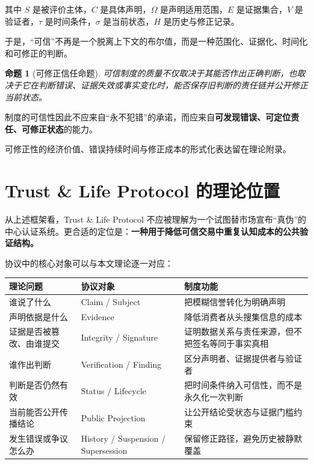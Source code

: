 \documentclass[UTF8,12pt]{ctexart}
\newtheorem{proposition}{命题}
\begin{document}
其中 $S$ 是被评价主体，$C$ 是具体声明，$\Omega$ 是声明适用范围，$E$ 是证据集合，$V$ 是验证者，$\tau$ 是时间条件，$\sigma$ 是当前状态，$H$ 是历史与修正记录。

于是，“可信”不再是一个脱离上下文的布尔值，而是一种范围化、证据化、时间化和可修正的判断。

\begin{proposition}[可修正信任命题]
可信制度的质量不仅取决于其能否作出正确判断，也取决于它在判断错误、证据失效或事实变化时，能否保存旧判断的责任链并公开修正当前状态。
\end{proposition}

制度的可信性因此不应来自“永不犯错”的承诺，而应来自\textbf{可发现错误、可定位责任、可修正状态}的能力。

可修正性的经济价值、错误持续时间与修正成本的形式化表达留在理论附录。

\section{Trust \& Life Protocol 的理论位置}

从上述框架看，Trust \& Life Protocol 不应被理解为一个试图替市场宣布“真伪”的中心认证系统。更合适的定位是：\textbf{一种用于降低可信交易中重复认知成本的公共验证结构。}

协议中的核心对象可以与本文理论逐一对应：

\begin{center}
\begin{tabularx}{\textwidth}{@{}p{}p{}X@{}}
\toprule
\textbf{理论问题} & \textbf{协议对象} & \textbf{制度功能} \\
\midrule
谁说了什么 & Claim / Subject & 把模糊信誉转化为明确声明 \\
声明依据是什么 & Evidence & 降低消费者从头搜集信息的成本 \\
证据是否被篡改、由谁提交 & Integrity / Signature & 证明数据关系与责任来源，但不把签名等同于事实真相 \\
谁作出判断 & Verification / Finding & 区分声明者、证据提供者与验证者 \\
判断是否仍然有效 & Status / Lifecycle & 把时间条件纳入可信性，而不是永久化一次判断 \\
当前能否公开传播结论 & Public Projection & 让公开结论受状态与证据门槛约束 \\
发生错误或争议怎么办 & History / Suspension / Supersession & 保留修正路径，避免历史被静默覆盖 \\
\bottomrule
\end{tabularx}
\end{center}
\end{document}
